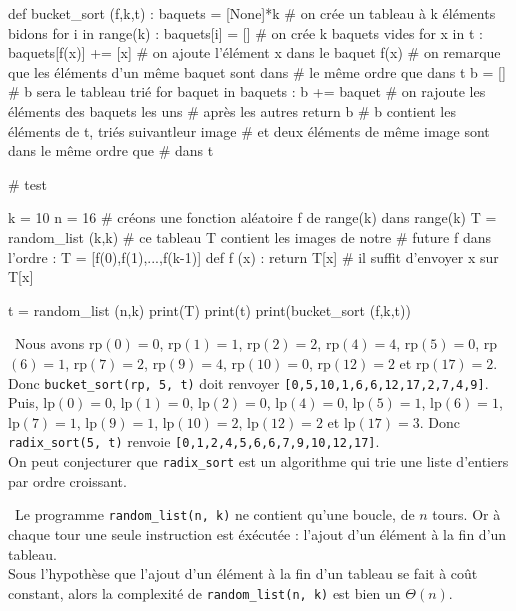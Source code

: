 \begin{python}

def bucket_sort (f,k,t) :
    baquets = [None]*k # on crée un tableau à k éléments bidons
    for i in range(k) :
        baquets[i] = [] # on crée k baquets vides
    for x in t :
        baquets[f(x)] += [x] # on ajoute l'élément x dans le baquet f(x)
                # on remarque que les éléments d'un même baquet sont dans
                # le même ordre que dans t
    b = [] # b sera le tableau trié
    for baquet in baquets :
        b += baquet # on rajoute les éléments des baquets les uns
                    # après les autres
    return b # b contient les éléments de t, triés suivantleur image
        # et deux éléments de même image sont dans le même ordre que
        # dans t

# test

k = 10
n = 16
# créons une fonction aléatoire f de range(k) dans range(k)
T = random_list (k,k) # ce tableau T contient les images de notre
    # future f dans l'ordre : T = [f(0),f(1),...,f(k-1)]
def f (x) :
    return T[x] # il suffit d'envoyer x sur T[x]

t = random_list (n,k)
print(T)
print(t)
print(bucket_sort (f,k,t))

\end{python}


\question\
Nous avons rp$(0)=0$, rp$(1)=1$, rp$(2)=2$, rp$(4)=4$, rp$(5)=0$, rp$(6)=1$, rp$(7)=2$, rp$(9)=4$, rp$(10)=0$, 
rp$(12)=2$ et rp$(17)=2$. Donc \texttt{bucket\_sort(rp, 5, t)} doit renvoyer \texttt{[0,5,10,1,6,6,12,17,2,7,4,9]}.\\
Puis, lp$(0)=0$, lp$(1)=0$, lp$(2)=0$, lp$(4)=0$, lp$(5)=1$, lp$(6)=1$, lp$(7)=1$, lp$(9)=1$, lp$(10)=2$, lp$(12)=2$ et 
lp$(17)=3$. Donc \texttt{radix\_sort(5, t)} renvoie \texttt{[0,1,2,4,5,6,6,7,9,10,12,17]}.\\
On peut conjecturer que \texttt{radix\_sort} est un algorithme qui trie une liste d'entiers par ordre croissant.



\question\ Le programme 
\verb|random_list(n, k)| ne contient qu'une boucle, de $n$ 
tours. Or à chaque tour une seule instruction est éxécutée : l'ajout d'un 
élément à la fin d'un tableau.\\
Sous l'hypothèse que l'ajout d'un élément à la fin d'un tableau se fait à 
coût constant, alors la complexité de \verb|random_list(n, k)| est bien un 
$\Theta(n)$.\\

